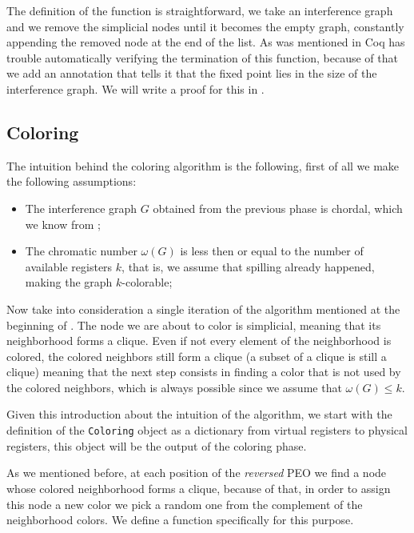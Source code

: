 The definition of the function is straightforward, we take an interference graph and we remove the simplicial nodes until it becomes the empty graph, constantly appending the removed node at the end of the list.
As was mentioned in  Coq has trouble automatically verifying the termination of this function, because of that we add an annotation that tells it that the fixed point lies in the size of the interference graph. We will write a proof for this in .

\subsection{Coloring}
\label{subsec:coloring}

The intuition behind the coloring algorithm is the following, first of all we make the following assumptions:

\begin{itemize}
  \item The interference graph $G$ obtained from the previous phase is chordal, which we know from ;
  \item The chromatic number $\omega(G)$ is less then or equal to the number of available registers $k$, that is, we assume that spilling already happened, making the graph $k$-colorable;
\end{itemize}

Now take into consideration a single iteration of the algorithm mentioned at the beginning of . The node we are about to color is simplicial, meaning that its neighborhood forms a clique. Even if not every element of the neighborhood is colored, the colored neighbors still form a clique (a subset of a clique is still a clique) meaning that the next step consists in finding a color that is not used by the colored neighbors, which is always possible since we assume that $\omega(G) \leq k$.

Given this introduction about the intuition of the algorithm, we start with the definition of the \texttt{Coloring} object as a dictionary from virtual registers to physical registers, this object will be the output of the coloring phase.

As we mentioned before, at each position of the \textit{reversed} PEO we find a node whose colored neighborhood forms a clique, because of that, in order to assign this node a new color we pick a random one from the complement of the neighborhood colors. We define a function specifically for this purpose.

